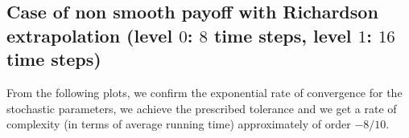 \documentclass[11pt]{article}
\begin{document}
\newpage



\subsection{Case of non smooth payoff  with Richardson extrapolation (level $0$: $8$ time steps, level $1$: $16$ time steps) }





From the following plots, we confirm the exponential rate of convergence for the stochastic parameters, we achieve the prescribed tolerance and  we get a rate of complexity (in terms of average running time) approximately of order $-8/10$.
\end{document}
